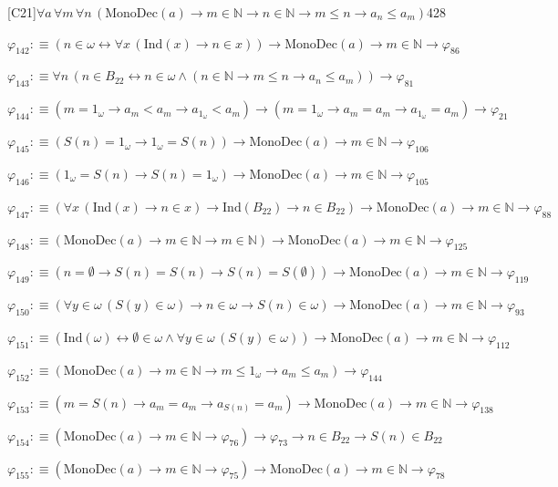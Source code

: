 \begin{fullproof}{[C21]}{$\forall a\,\forall m\,\forall n\,(\mathrm{MonoDec}(a) \to m \in \mathbb{N} \to n \in \mathbb{N} \to m \leq n \to a_{n} \leq a_{m})$}{428}
\begin{abbrevlist}
\item $\varphi_{142} :\equiv (n \in \omega \leftrightarrow \forall x\,(\mathrm{Ind}(x) \to n \in x)) \to \mathrm{MonoDec}(a) \to m \in \mathbb{N} \to \varphi_{86}$
\item $\varphi_{143} :\equiv \forall n\,(n \in B_{22} \leftrightarrow n \in \omega \land (n \in \mathbb{N} \to m \leq n \to a_{n} \leq a_{m})) \to \varphi_{81}$
\item $\varphi_{144} :\equiv (m = 1_{\omega} \to a_{m} < a_{m} \to a_{1_{\omega}} < a_{m}) \to (m = 1_{\omega} \to a_{m} = a_{m} \to a_{1_{\omega}} = a_{m}) \to \varphi_{21}$
\item $\varphi_{145} :\equiv (S(n) = 1_{\omega} \to 1_{\omega} = S(n)) \to \mathrm{MonoDec}(a) \to m \in \mathbb{N} \to \varphi_{106}$
\item $\varphi_{146} :\equiv (1_{\omega} = S(n) \to S(n) = 1_{\omega}) \to \mathrm{MonoDec}(a) \to m \in \mathbb{N} \to \varphi_{105}$
\item $\varphi_{147} :\equiv (\forall x\,(\mathrm{Ind}(x) \to n \in x) \to \mathrm{Ind}(B_{22}) \to n \in B_{22}) \to \mathrm{MonoDec}(a) \to m \in \mathbb{N} \to \varphi_{88}$
\item $\varphi_{148} :\equiv (\mathrm{MonoDec}(a) \to m \in \mathbb{N} \to m \in \mathbb{N}) \to \mathrm{MonoDec}(a) \to m \in \mathbb{N} \to \varphi_{125}$
\item $\varphi_{149} :\equiv (n = \emptyset \to S(n) = S(n) \to S(n) = S(\emptyset)) \to \mathrm{MonoDec}(a) \to m \in \mathbb{N} \to \varphi_{119}$
\item $\varphi_{150} :\equiv (\forall y \in \omega\,(S(y) \in \omega) \to n \in \omega \to S(n) \in \omega) \to \mathrm{MonoDec}(a) \to m \in \mathbb{N} \to \varphi_{93}$
\item $\varphi_{151} :\equiv (\mathrm{Ind}(\omega) \leftrightarrow \emptyset \in \omega \land \forall y \in \omega\,(S(y) \in \omega)) \to \mathrm{MonoDec}(a) \to m \in \mathbb{N} \to \varphi_{112}$
\item $\varphi_{152} :\equiv (\mathrm{MonoDec}(a) \to m \in \mathbb{N} \to m \leq 1_{\omega} \to a_{m} \leq a_{m}) \to \varphi_{144}$
\item $\varphi_{153} :\equiv (m = S(n) \to a_{m} = a_{m} \to a_{S(n)} = a_{m}) \to \mathrm{MonoDec}(a) \to m \in \mathbb{N} \to \varphi_{138}$
\item $\varphi_{154} :\equiv (\mathrm{MonoDec}(a) \to m \in \mathbb{N} \to \varphi_{76}) \to \varphi_{73} \to n \in B_{22} \to S(n) \in B_{22}$
\item $\varphi_{155} :\equiv (\mathrm{MonoDec}(a) \to m \in \mathbb{N} \to \varphi_{75}) \to \mathrm{MonoDec}(a) \to m \in \mathbb{N} \to \varphi_{78}$

\end{abbrevlist}
\end{fullproof}
